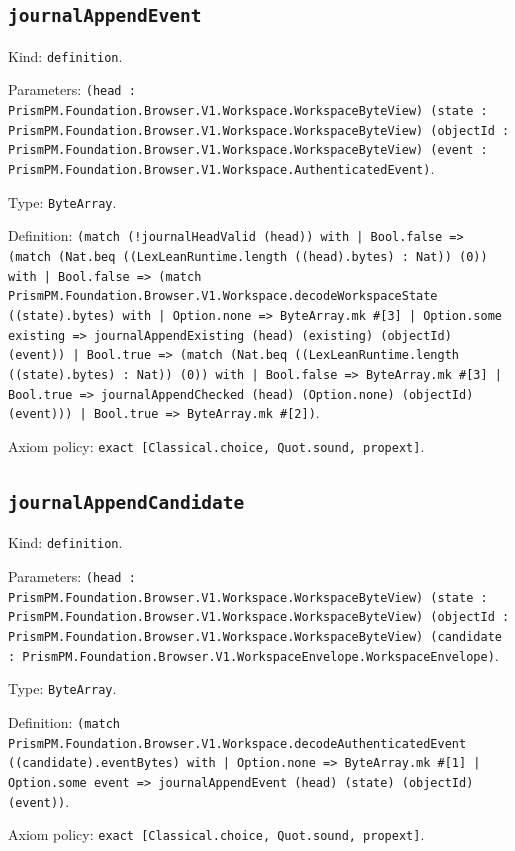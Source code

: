 \documentclass[11pt]{article}
\begin{document}
\subsection*{\texttt{journalAppendEvent}}
\noindent Kind: \texttt{definition}.\par
\noindent Parameters: \texttt{(head : PrismPM.Foundation.Browser.V1.Workspace.WorkspaceByteView) (state : PrismPM.Foundation.Browser.V1.Workspace.WorkspaceByteView) (objectId : PrismPM.Foundation.Browser.V1.Workspace.WorkspaceByteView) (event : PrismPM.Foundation.Browser.V1.Workspace.AuthenticatedEvent)}.\par
\noindent Type: \texttt{ByteArray}.\par
\noindent Definition: \texttt{(match (!journalHeadValid (head)) with | Bool.false => (match (Nat.beq ((LexLeanRuntime.length ((head).bytes) : Nat)) (0)) with | Bool.false => (match PrismPM.Foundation.Browser.V1.Workspace.decodeWorkspaceState ((state).bytes) with | Option.none => ByteArray.mk \#[3] | Option.some existing => journalAppendExisting (head) (existing) (objectId) (event)) | Bool.true => (match (Nat.beq ((LexLeanRuntime.length ((state).bytes) : Nat)) (0)) with | Bool.false => ByteArray.mk \#[3] | Bool.true => journalAppendChecked (head) (Option.none) (objectId) (event))) | Bool.true => ByteArray.mk \#[2])}.\par
\noindent Axiom policy: \texttt{exact [Classical.choice, Quot.sound, propext]}.\par
\subsection*{\texttt{journalAppendCandidate}}
\noindent Kind: \texttt{definition}.\par
\noindent Parameters: \texttt{(head : PrismPM.Foundation.Browser.V1.Workspace.WorkspaceByteView) (state : PrismPM.Foundation.Browser.V1.Workspace.WorkspaceByteView) (objectId : PrismPM.Foundation.Browser.V1.Workspace.WorkspaceByteView) (candidate : PrismPM.Foundation.Browser.V1.WorkspaceEnvelope.WorkspaceEnvelope)}.\par
\noindent Type: \texttt{ByteArray}.\par
\noindent Definition: \texttt{(match PrismPM.Foundation.Browser.V1.Workspace.decodeAuthenticatedEvent ((candidate).eventBytes) with | Option.none => ByteArray.mk \#[1] | Option.some event => journalAppendEvent (head) (state) (objectId) (event))}.\par
\noindent Axiom policy: \texttt{exact [Classical.choice, Quot.sound, propext]}.\par
\end{document}
